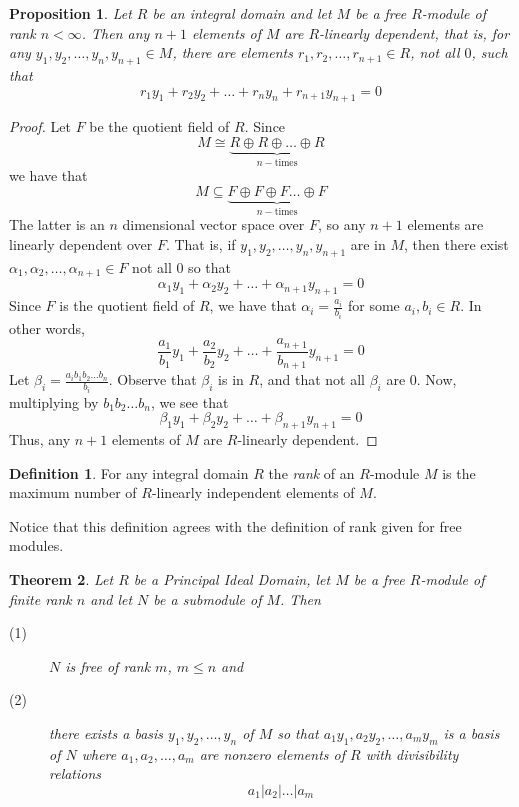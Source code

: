 \documentclass[12pt,leqno]{article}
\numberwithin{equation}{section}
\newtheorem{thm}{Theorem}[section]
\newtheorem{prop}[thm]{Proposition}
\theoremstyle{definition}
\newtheorem*{Def}{Definition}
\begin{document}
\begin{prop}
 Let $R$ be an integral domain and let $M$ be a free $R$-module of rank $n<\infty$. Then any $n+1$ elements of $M$ are $R$-linearly dependent, that is, for any $y_1,y_2,\hdots,y_n,y_{n+1}\in M$, there are elements $r_1,r_2,\hdots,r_{n+1}\in R$, not all $0$, such that \[r_1y_1+r_2y_2+\hdots+r_ny_n+r_{n+1}y_{n+1}=0\]
\end{prop}

\begin{proof}
Let $F$ be the quotient field of $R$. Since \[M\cong\underbrace{R\oplus R\oplus\hdots\oplus R}_{n-\text{times}}\] we have that \[M\subseteq\underbrace{F\oplus F\oplus F\hdots\oplus F}_{n-\text{times}}\] The latter is an $n$ dimensional vector space over $F$, so any $n+1$ elements are linearly dependent over $F$. That is, if $y_1,y_2,\hdots,y_n,y_{n+1}$ are in $M$, then there exist $\alpha_1,\alpha_2,\hdots,\alpha_{n+1}\in F$ not all $0$ so that \[\alpha_1y_1+\alpha_2y_2+\hdots+\alpha_{n+1}y_{n+1}=0\] Since $F$ is the quotient field of $R$, we have that $\alpha_i=\frac{a_i}{b_i}$ for some $a_i,b_i\in R$. In other words, \[\frac{a_1}{b_1}y_1+\frac{a_2}{b_2}y_2+\hdots+\frac{a_{n+1}}{b_{n+1}}y_{n+1}=0\] Let $\beta_i=\frac{a_ib_1b_2\hdots b_n}{b_i}$. Observe that $\beta_i$ is in $R$, and that not all $\beta_i$ are $0$. Now, multiplying by $b_1b_2\hdots b_n$, we see that \[\beta_1y_1+\beta_2y_2+\hdots+\beta_{n+1}y_{n+1}=0\] Thus, any $n+1$ elements of $M$ are $R$-linearly dependent.
\end{proof}

\begin{Def}
 For any integral domain $R$ the \textit{rank} of an $R$-module $M$ is the maximum number of $R$-linearly independent elements of $M$.
\end{Def}

Notice that this definition agrees with the definition of rank given for free modules.

\begin{thm}
Let $R$ be a Principal Ideal Domain, let $M$ be a free $R$-module of finite rank $n$ and let $N$ be a submodule of $M$. Then
\begin{description}
 \item [(1)] $N$ is free of rank $m$, $m\leq n$ and
 \item [(2)] there exists a basis $y_1,y_2,\hdots,y_n$ of $M$ so that $a_1y_1,a_2y_2,\hdots,a_my_m$ is a basis of $N$ where $a_1,a_2,\hdots,a_m$ are nonzero elements of $R$ with divisibility relations \[a_1|a_2|\hdots|a_m\]
\end{description}
\end{thm}
\end{document}
